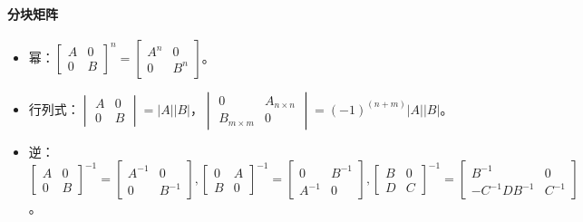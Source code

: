 \documentclass[
12pt, %
a4paper, 
oneside, %
headinclude,footinclude, %
]{scrartcl}
\begin{document}
\paragraph{分块矩阵}
\begin{itemize}
\item 幂：$ \begin{bmatrix} A & 0 \\ 0 & B \end{bmatrix}^n = \begin{bmatrix} A^n & 0 \\ 0 & B^n \end{bmatrix} $。  
\item 行列式：$ \begin{vmatrix} A & 0 \\ 0 & B \end{vmatrix} = |A||B| $，$ \begin{vmatrix} 0 & A_{n \times n} \\ B_{m \times m} & 0 \end{vmatrix} = (-1)^{(n + m)}|A||B| $。
\item 逆：$ \begin{bmatrix} A & 0 \\ 0 & B \end{bmatrix}^{-1} = \begin{bmatrix} A^{-1} & 0 \\ 0 & B^{-1} \end{bmatrix}, \begin{bmatrix} 0 & A \\ B & 0 \end{bmatrix}^{-1} = \begin{bmatrix} 0 & B^{-1} \\ A^{-1} & 0 \end{bmatrix}, \begin{bmatrix} B & 0 \\ D & C \end{bmatrix}^{-1} = \begin{bmatrix} B^{-1} & 0 \\ -C^{-1}DB^{-1} & C^{-1} \end{bmatrix} $。
\end{itemize}
\end{document}
